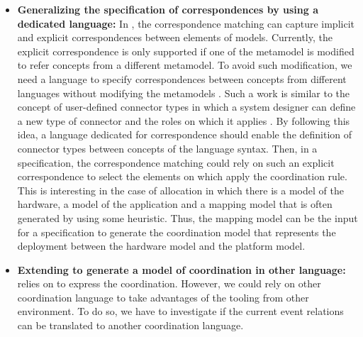 \begin{itemize}
	\item \textbf{Generalizing the specification of correspondences by using a dedicated language:} In \bcool, the correspondence matching can capture implicit and explicit correspondences between elements of models. Currently, the explicit correspondence is only supported if one of the metamodel is modified to refer concepts from a different metamodel. To avoid such modification, we need a language to specify correspondences between concepts from different languages without modifying the metamodels . Such a work is similar to the concept of user-defined connector types in which a system designer can define a new type of connector and the roles on which it applies . By following this idea, a language dedicated for correspondence should enable the definition of connector types between concepts of the language syntax. Then, in a \bcool specification, the correspondence matching could rely on such an explicit correspondence to select the elements on which apply the coordination rule. This is interesting in the case of allocation in which there is a model of the hardware, a model of the application and a mapping model that is often generated by using some heuristic. Thus, the mapping model can be the input for a \bcool specification to generate the coordination model that represents the deployment between the hardware model and the platform model.
	\item \textbf{Extending \bcool to generate a model of coordination in other language:} \bcool relies on \ccsl to express the coordination. However, we could rely on other coordination language to take advantages of the tooling from other environment. To do so, we have to investigate if the current event relations can be translated to another coordination language.
	

\end{itemize}
